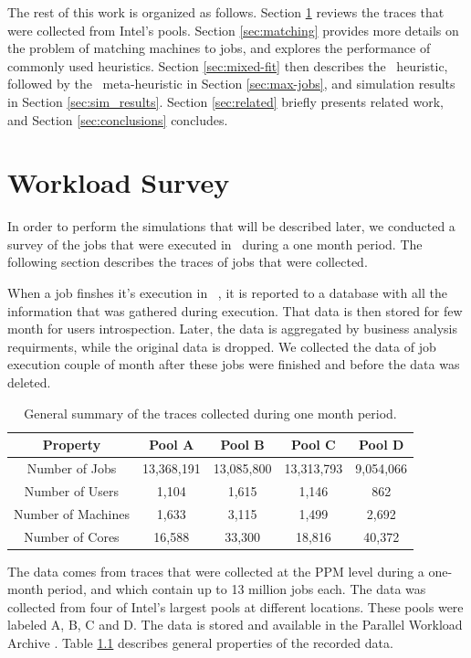 The rest of this work is organized as follows.
Section \ref{sec:traces} reviews the traces that were collected from Intel's pools.
Section \ref{sec:matching} provides more details on the problem of
matching machines to jobs, and explores the performance of commonly
used heuristics.
Section \ref{sec:mixed-fit} then describes the \mif\ heuristic,
followed by the \maj\ meta-heuristic in Section \ref{sec:max-jobs},
and simulation results in Section \ref{sec:sim_results}.
Section \ref{sec:related} briefly presents related work, and Section
\ref{sec:conclusions} concludes.

\chapter{Workload Survey}
\label{sec:traces}
In order to perform the simulations that will be described later, 
we conducted a survey of the jobs that were executed in \nb\ during a one month period.
The following section describes the traces of jobs that were collected.

When a job finshes it's execution in \nb\ , it is reported to a database 
with all the information that was gathered during execution.
That data is then stored for few month for users introspection. Later, the data is 
aggregated by business analysis requirments, while the original data is dropped.
We collected the data of job execution couple of month after these jobs were finished 
and before the data was deleted.

\begin{table}\centering
\begin{tabular}{|c|c|c|c|c|}

\hline 
Property & Pool A & Pool B & Pool C & Pool D\tabularnewline
\hline 
Number of Jobs & 13,368,191 & 13,085,800 & 13,313,793 & 9,054,066\tabularnewline
\hline 
Number of Users & 1,104 & 1,615 & 1,146 & 862\tabularnewline
\hline 
Number of Machines & 1,633 & 3,115 & 1,499 & 2,692\tabularnewline
\hline 
Number of Cores & 16,588 & 33,300 & 18,816 & 40,372\tabularnewline
\hline 
\end{tabular}
\caption{General summary of the traces collected during one month period.}
\label{tab:jobs_properties}
\end{table}

The data comes from traces that were collected at the PPM
level during a one-month period, and which contain up to 13 million jobs each.
The data was collected from four of Intel's largest pools at different locations. 
These pools were labeled A, B, C and D.
The data is stored and available in the Parallel Workload Archive \cite{parallel13}.
Table \ref{tab:jobs_properties} describes general properties of the recorded data.

